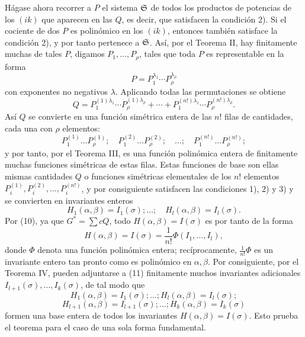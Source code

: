 Hágase ahora recorrer a \(P\) el sistema \(\mathfrak S\) de todos los productos de potencias de los \((ik)\) que aparecen en las \(Q\), es decir, que satisfacen la condición 2). Si el cociente de dos \(P\) es polinómico en los \((ik)\), entonces también satisface la condición 2), y por tanto pertenece a \(\mathfrak S\). Así, por el Teorema II, hay finitamente muchas de tales \(P\), digamos \(P_1,\ldots,P_\rho\), tales que toda \(P\) es representable en la forma
\[
        P=P_1^{\lambda_1}\cdots P_\rho^{\lambda_\rho}
\]
con exponentes no negativos \(\lambda\). Aplicando todas las permutaciones se obtiene
\[
        Q=
        P_1^{(1)\lambda_1}\cdots P_\rho^{(1)\lambda_\rho}
        +\cdots+
        P_1^{(n!)\lambda_1}\cdots P_\rho^{(n!)\lambda_\rho}.
\]
Así \(Q\) se convierte en una función simétrica entera de las \(n!\) filas de cantidades, cada una con \(\rho\) elementos:
\[
        P_1^{(1)}\ldots P_\rho^{(1)};
        \quad
        P_1^{(2)}\ldots P_\rho^{(2)};
        \quad \ldots;\quad
        P_1^{(n!)}\ldots P_\rho^{(n!)};
\]
y por tanto, por el Teorema III, es una función polinómica entera de finitamente muchas funciones simétricas de estas filas. Estas funciones de base son ellas mismas cantidades \(Q\) o funciones simétricas elementales de los \(n!\) elementos \(P_i^{(1)},P_i^{(2)},\ldots,P_i^{(n!)}\), y por consiguiente satisfacen las condiciones 1), 2) y 3) y se convierten en invariantes enteros
\begin{equation}
        H_1(\alpha,\beta)=I_1(\sigma);\ldots;\quad
        H_l(\alpha,\beta)=I_l(\sigma).
\end{equation}
Por (10), ya que \(G^*=\sum cQ\), todo \(H(\alpha,\beta)=I(\sigma)\) es por tanto de la forma
\[
        H(\alpha,\beta)=I(\sigma)=\frac1{n!}\Phi(I_1,\ldots,I_l),
\]
donde \(\Phi\) denota una función polinómica entera; recíprocamente, \(\frac1{n!}\Phi\) es un invariante entero tan pronto como es polinómico en \(\alpha,\beta\). Por consiguiente, por el Teorema IV, pueden adjuntarse a (11) finitamente muchos invariantes adicionales \(I_{l+1}(\sigma),\ldots,I_k(\sigma)\), de tal modo que
\[
        H_1(\alpha,\beta)=I_1(\sigma);\ldots;H_l(\alpha,\beta)=I_l(\sigma);
\]
\[
        H_{l+1}(\alpha,\beta)=I_{l+1}(\sigma);\ldots;H_k(\alpha,\beta)=I_k(\sigma)
\]
formen una base entera de todos los invariantes \(H(\alpha,\beta)=I(\sigma)\). Esto prueba el teorema para el caso de una sola forma fundamental.

